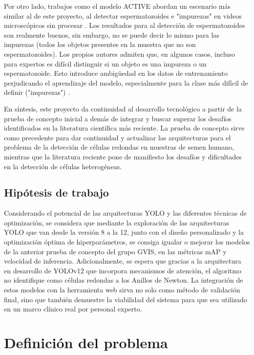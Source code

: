\documentclass[12pt,a4paper,onecolumn,oneside]{report}
\begin{document}
Por otro lado, trabajos como el modelo ACTIVE abordan un escenario más similar al de este proyecto, al detectar espermatozoides e "impurezas" en videos microscópicos sin procesar \cite{chen2024}. Los resultados para al detección de espermatozoides son realmente buenos, sin embargo, no se puede decir lo mismo
para las impurezas (todos los objetos presentes en la muestra que no son espermatozoides). Los propios autores admiten que, en algunos casos, incluso para expertos es difícil distinguir si un objeto
es una impureza o un espermatozoide. Esto introduce ambigüedad en los datos de entrenamiento perjudicando el aprendizaje del modelo, especialmente para la clase más difícil de definir ("impurezas") \cite{chen2024}.

En síntesis, este proyecto da continuidad al desarrollo tecnológico a partir de la prueba de concepto inicial a demás de integrar y buscar superar los desafíos identificados en la literatura científica más reciente. La prueba de concepto sirve como precedente para dar continuidad y actualizar las 
arquitecturas para el problema de la detección de células redondas en muestras de semen humano, mientras que la literatura reciente pone de manifiesto los desafíos y dificultades en la detección de células heterogéneas. 


\subsection{Hipótesis de trabajo}

Considerando el potencial de las arquitecturas YOLO y las diferentes técnicas de optimización, se considera que mediante la exploración de las arquitecturas YOLO que van desde la versión 8 a la 12, 
junto con el diseño personalizado y la optimización óptima de hiperparámetros, se consiga igualar o mejorar los modelos de la anterior prueba de concepto del grupo GVIS, 
en las métricas mAP y velocidad de inferencia. Adicionalmente, se espera que gracias a la arquitectura en desarrollo de YOLOv12 que incorpora mecanismos de atención, el algoritmo no identifique 
como células redondas a los Anillos de Newton. La integración de estos modelos con la herramienta web sirva no solo como método de validación final, sino que también demuestre la viabilidad del sistema 
para que sea utilizado en un marco clínico real por personal experto.

\section{Definición del problema}
\label{sec:Definición del problema}
\end{document}
